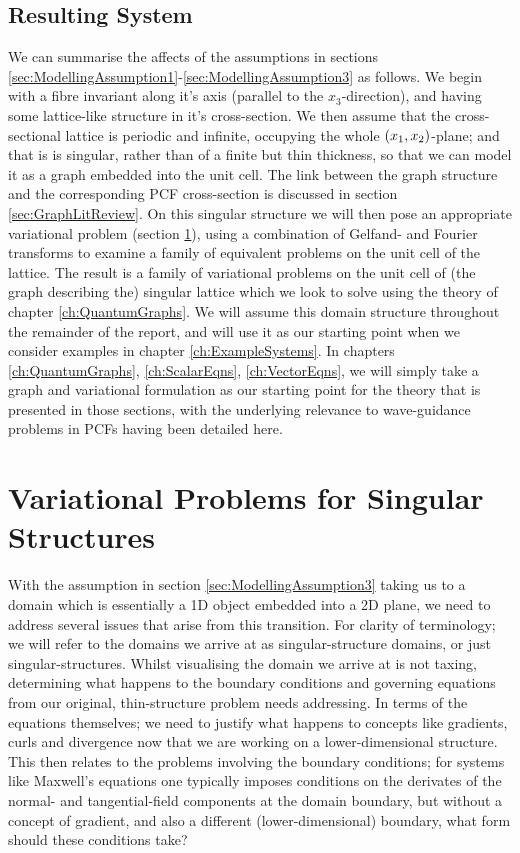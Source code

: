 \subsection{Resulting System} \label{sec:OurSystem}
We can summarise the affects of the assumptions in sections \ref{sec:ModellingAssumption1}-\ref{sec:ModellingAssumption3} as follows.
We begin with a fibre invariant along it's axis (parallel to the $x_3$-direction), and having some lattice-like structure in it's cross-section.
We then assume that the cross-sectional lattice is periodic and infinite, occupying the whole $\left( x_1,x_2 \right)$-plane; and that is is singular, rather than of a finite but thin thickness, so that we can model it as a graph embedded into the unit cell.
The link between the graph structure and the corresponding PCF cross-section is discussed in section \ref{sec:GraphLitReview}.
On this singular structure we will then pose an appropriate variational problem (section \ref{sec:VariationalProblemLitReview}), using a combination of Gelfand- and Fourier transforms to examine a family of equivalent problems on the unit cell of the lattice.
The result is a family of variational problems on the unit cell of (the graph describing the) singular lattice which we look to solve using the theory of chapter \ref{ch:QuantumGraphs}.
We will assume this domain structure throughout the remainder of the report, and will use it as our starting point when we consider examples in chapter \ref{ch:ExampleSystems}.
In chapters \ref{ch:QuantumGraphs}, \ref{ch:ScalarEqns}, \ref{ch:VectorEqns}, we will simply take a graph and variational formulation as our starting point for the theory that is presented in those sections, with the underlying relevance to wave-guidance problems in PCFs having been detailed here.

\section{Variational Problems for Singular Structures} \label{sec:VariationalProblemLitReview}
With the assumption in section \ref{sec:ModellingAssumption3} taking us to a domain which is essentially a 1D object embedded into a 2D plane, we need to address several issues that arise from this transition.
For clarity of terminology; we will refer to the domains we arrive at as singular-structure domains, or just singular-structures.
Whilst visualising the domain we arrive at is not taxing, determining what happens to the boundary conditions and governing equations from our original, thin-structure problem needs addressing.
In terms of the equations themselves; we need to justify what happens to concepts like gradients, curls and divergence now that we are working on a lower-dimensional structure.
This then relates to the problems involving the boundary conditions; for systems like Maxwell's equations one typically imposes conditions on the derivates of the normal- and tangential-field components at the domain boundary, but without a concept of gradient, and also a different (lower-dimensional) boundary, what form should these conditions take? \newline

